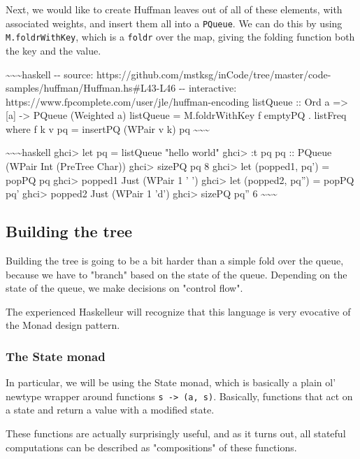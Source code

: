 \documentclass[]{article}
\begin{document}
Next, we would like to create Huffman leaves out of all of these elements, with
associated weights, and insert them all into a \texttt{PQueue}. We can do this
by using \texttt{M.foldrWithKey}, which is a \texttt{foldr} over the map, giving
the folding function both the key and the value.

\textasciitilde{}\textasciitilde{}\textasciitilde{}haskell -\/- source:
https://github.com/mstksg/inCode/tree/master/code-samples/huffman/Huffman.hs\#L43-L46
-\/- interactive: https://www.fpcomplete.com/user/jle/huffman-encoding listQueue
:: Ord a =\textgreater{} {[}a{]} -\textgreater{} PQueue (Weighted a) listQueue =
M.foldrWithKey f emptyPQ . listFreq where f k v pq = insertPQ (WPair v k) pq
\textasciitilde{}\textasciitilde{}\textasciitilde{}

\textasciitilde{}\textasciitilde{}\textasciitilde{}haskell ghci\textgreater{}
let pq = listQueue "hello world" ghci\textgreater{} :t pq pq :: PQueue (WPair
Int (PreTree Char)) ghci\textgreater{} sizePQ pq 8 ghci\textgreater{} let
(popped1, pq') = popPQ pq ghci\textgreater{} popped1 Just (WPair 1 ' ')
ghci\textgreater{} let (popped2, pq'') = popPQ pq' ghci\textgreater{} popped2
Just (WPair 1 'd') ghci\textgreater{} sizePQ pq'' 6
\textasciitilde{}\textasciitilde{}\textasciitilde{}

\subsection{Building the tree}

Building the tree is going to be a bit harder than a simple fold over the queue,
because we have to "branch" based on the state of the queue. Depending on the
state of the queue, we make decisions on "control flow".

The experienced Haskelleur will recognize that this language is very evocative
of the Monad design pattern.

\subsubsection{The State monad}

In particular, we will be using the State monad, which is basically a plain ol'
newtype wrapper around functions \texttt{s\ -\textgreater{}\ (a,\ s)}.
Basically, functions that act on a state and return a value with a modified
state.

These functions are actually surprisingly useful, and as it turns out, all
stateful computations can be described as "compositions" of these functions.
\end{document}

